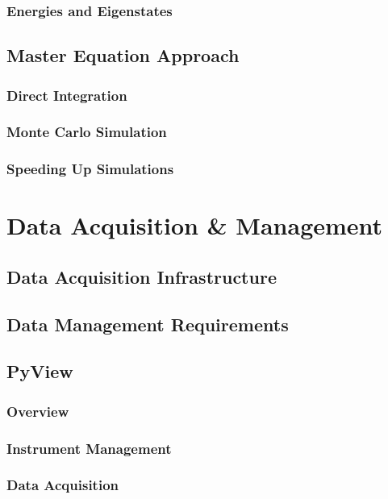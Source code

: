 \documentclass{scrbook}
\begin{document}
\subsection{Energies and Eigenstates}

\section{Master Equation Approach}

\subsection{Direct Integration}

\subsection{Monte Carlo Simulation}

\subsection{Speeding Up Simulations}

\chapter{Data Acquisition \& Management}

\section{Data Acquisition Infrastructure}

\section{Data Management Requirements}

\section{PyView}

\subsection{Overview}

\subsection{Instrument Management}

\subsection{Data Acquisition}
\end{document}

